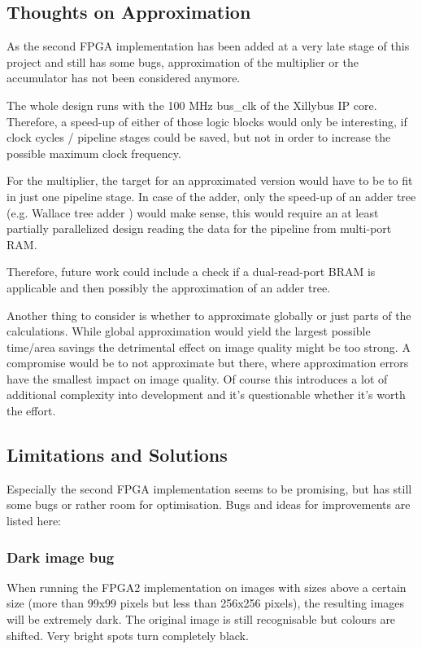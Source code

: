 \documentclass[
			fontsize = 12pt,
			paper = a4
			]
			{scrartcl}%
\newcommand{\?}{\ensuremath{^\texttt{\textbf [CITATION~NEEDED]}}}
\begin{document}
\newpage
\subsection{Thoughts on Approximation}

As the second FPGA implementation has been added at a very late stage of this project and still has some bugs, approximation of the multiplier or the accumulator has not been considered anymore.

The whole design runs with the 100 MHz bus\_clk of the Xillybus IP core.
Therefore, a speed-up of either of those logic blocks would only be interesting, if clock cycles / pipeline stages could be saved, but not in order to increase the possible maximum clock frequency.

For the multiplier, the target for an approximated version would have to be to fit in just one pipeline stage.
In case of the adder, only the speed-up of an adder tree (e.g. Wallace tree adder \cite{sharma2016design}) would make sense, this would require an at least partially parallelized design reading the data for the pipeline from multi-port RAM.

Therefore, future work could include a check if a dual-read-port BRAM is applicable and then possibly the approximation of an adder tree.

Another thing to consider is whether to approximate globally or just parts of the calculations. While global approximation would yield the largest possible time/area savings the detrimental effect on image quality might be too strong. A compromise would be to not approximate but there, where approximation errors have the smallest impact on image quality. Of course this introduces a lot of additional complexity into development and it's questionable whether it's worth the effort.

\subsection{Limitations and Solutions}

Especially the second FPGA implementation seems to be promising, but has still some bugs or rather room for optimisation. Bugs and ideas for improvements are listed here:

\subsubsection{Dark image bug}
\label{sec:bug}

When running the FPGA2 implementation on images with sizes above a certain size (more than 99x99 pixels but less than 256x256 pixels), the resulting images will be extremely dark. The original image is still recognisable but colours are shifted. Very bright spots turn completely black.
\end{document}
